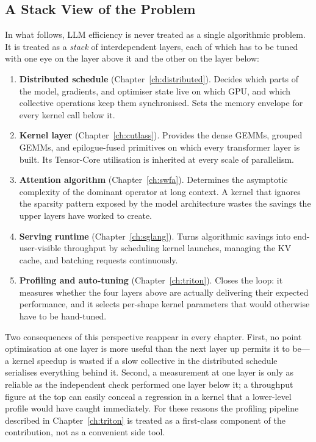 \subsection{A Stack View of the Problem}\label{sec:intro_stack}
In what follows, LLM efficiency is never treated as a single
algorithmic problem. It is treated as a \emph{stack} of interdependent
layers, each of which has to be tuned with one eye on the layer
above it and the other on the layer below:
\begin{enumerate}
    \item \textbf{Distributed schedule} (Chapter~\ref{ch:distributed}).
          Decides which parts of the model, gradients, and optimiser
          state live on which GPU, and which collective operations keep
          them synchronised. Sets the memory envelope for every kernel
          call below it.
    \item \textbf{Kernel layer} (Chapter~\ref{ch:cutlass}). Provides the
          dense GEMMs, grouped GEMMs, and epilogue-fused primitives on
          which every transformer layer is built. Its Tensor-Core
          utilisation is inherited at every scale of parallelism.
    \item \textbf{Attention algorithm} (Chapter~\ref{ch:swfa}).
          Determines the asymptotic complexity of the dominant operator
          at long context. A kernel that ignores the sparsity pattern
          exposed by the model architecture wastes the savings the
          upper layers have worked to create.
    \item \textbf{Serving runtime} (Chapter~\ref{ch:sglang}). Turns
          algorithmic savings into end-user-visible throughput by
          scheduling kernel launches, managing the KV cache, and
          batching requests continuously.
    \item \textbf{Profiling and auto-tuning}
          (Chapter~\ref{ch:triton}). Closes the loop: it measures
          whether the four layers above are actually delivering their
          expected performance, and it selects per-shape kernel
          parameters that would otherwise have to be hand-tuned.
\end{enumerate}
Two consequences of this perspective reappear in every chapter.
First, no point optimisation at one layer is more useful than the
next layer up permits it to be---a kernel speedup is wasted if a
slow collective in the distributed schedule serialises everything
behind it. Second, a measurement at one layer is only as reliable
as the independent check performed one layer below it; a
throughput figure at the top can easily conceal a regression in a
kernel that a lower-level profile would have caught immediately.
For these reasons the profiling pipeline described in
Chapter~\ref{ch:triton} is treated as a first-class component of
the contribution, not as a convenient side tool.

